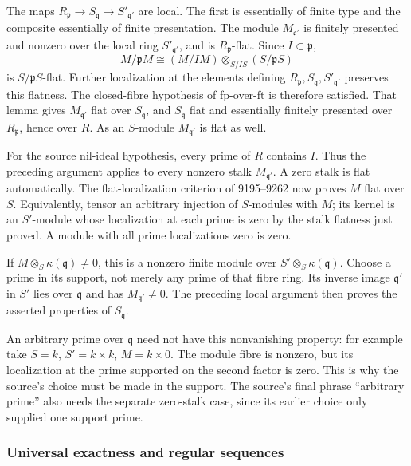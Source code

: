 The maps \(R_{\mathfrak p}\to S_{\mathfrak q}\to S'_{\mathfrak q'}\) are local. The first is essentially of finite type and the composite essentially of finite presentation. The module \(M_{\mathfrak q'}\) is finitely presented and nonzero over the local ring \(S'_{\mathfrak q'}\), and is \(R_{\mathfrak p}\)-flat. Since \(I\subset\mathfrak p\), \[
M/\mathfrak pM\cong (M/IM)\otimes_{S/IS}(S/\mathfrak pS)
\] is \(S/\mathfrak pS\)-flat. Further localization at the elements defining \(R_{\mathfrak p},S_{\mathfrak q},S'_{\mathfrak q'}\) preserves this flatness. The closed-fibre hypothesis of fp-over-ft is therefore satisfied. That lemma gives \(M_{\mathfrak q'}\) flat over \(S_{\mathfrak q}\), and \(S_{\mathfrak q}\) flat and essentially finitely presented over \(R_{\mathfrak p}\), hence over \(R\). As an \(S\)-module \(M_{\mathfrak q'}\) is flat as well.

For the source nil-ideal hypothesis, every prime of \(R\) contains \(I\). Thus the preceding argument applies to every nonzero stalk \(M_{\mathfrak q'}\). A zero stalk is flat automatically. The flat-localization criterion of 9195--9262 now proves \(M\) flat over \(S\). Equivalently, tensor an arbitrary injection of \(S\)-modules with \(M\); its kernel is an \(S'\)-module whose localization at each prime is zero by the stalk flatness just proved. A module with all prime localizations zero is zero.

If \(M\otimes_S\kappa(\mathfrak q)\ne0\), this is a nonzero finite module over \(S'\otimes_S\kappa(\mathfrak q)\). Choose a prime in its support, not merely any prime of that fibre ring. Its inverse image \(\mathfrak q'\) in \(S'\) lies over \(\mathfrak q\) and has \(M_{\mathfrak q'}\ne0\). The preceding local argument then proves the asserted properties of \(S_{\mathfrak q}\).

An arbitrary prime over \(\mathfrak q\) need not have this nonvanishing property: for example take \(S=k\), \(S'=k\times k\), \(M=k\times0\). The module fibre is nonzero, but its localization at the prime supported on the second factor is zero. This is why the source's choice must be made in the support. The source's final phrase ``arbitrary prime'' also needs the separate zero-stalk case, since its earlier choice only supplied one support prime.

\subsubsection{Universal exactness and regular sequences}\label{universal-exactness-and-regular-sequences}


